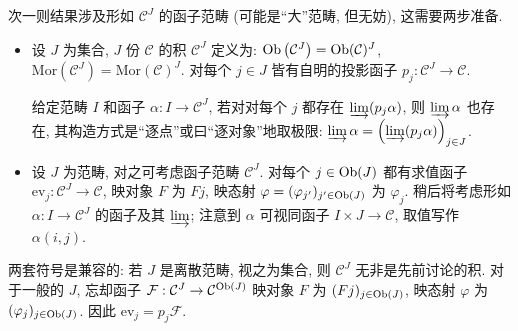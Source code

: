 次一则结果涉及形如 $\mathcal{C}^J$ 的函子范畴 (可能是``大''范畴, 但无妨), 这需要两步准备.

\begin{itemize}
	\item 设 $J$ 为集合, $J$ 份 $\mathcal{C}$ 的积 $\mathcal{C}^J$ 定义为: $\operatorname{Ob}\left(\mathcal{C}^J\right) = \operatorname{Ob}(\mathcal{C})^J$, $\mathrm{Mor}\left(\mathcal{C}^J \right) = \mathrm{Mor}(\mathcal{C})^J$. 对每个 $j \in J$ 皆有自明的投影函子 $p_j: \mathcal{C}^J \to \mathcal{C}$.

	给定范畴 $I$ 和函子 $\alpha: I \to \mathcal{C}^J$, 若对对每个 $j$ 都存在 $\varinjlim (p_j \alpha)$, 则 $\varinjlim \alpha$ 也存在, 其构造方式是``逐点''或曰``逐对象''地取极限: $\varinjlim \alpha = \left( \varinjlim (p_j \alpha) \right)_{j \in J}$.

	\item 设 $J$ 为范畴, 对之可考虑函子范畴 $\mathcal{C}^J$. 对每个 $j \in \operatorname{Ob}(J)$ 都有求值函子 $\mathrm{ev}_j: \mathcal{C}^J \to \mathcal{C}$, 映对象 $F$ 为 $Fj$, 映态射 $\varphi = (\varphi_{j'})_{j' \in \operatorname{Ob}(J)}$ 为 $\varphi_j$. 稍后将考虑形如 $\alpha: I \to \mathcal{C}^J$ 的函子及其 $\varinjlim$; 注意到 $\alpha$ 可视同函子 $I \times J \to \mathcal{C}$, 取值写作 $\alpha(i, j)$.
\end{itemize}

两套符号是兼容的: 若 $J$ 是离散范畴, 视之为集合, 则 $\mathcal{C}^J$ 无非是先前讨论的积. 对于一般的 $J$, 忘却函子 $\mathcal{F}: \mathcal{C}^J \to \mathcal{C}^{\operatorname{Ob}(J)}$ 映对象 $F$ 为 $(Fj)_{j \in \operatorname{Ob}(J)}$, 映态射 $\varphi$ 为 $(\varphi_j)_{j \in \operatorname{Ob}(J)}$. 因此 $\mathrm{ev}_j = p_j \mathcal{F}$.

